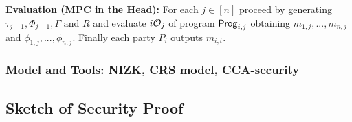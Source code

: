 \noindent
\textbf{Evaluation (MPC in the Head):} For each $j \in [n]$ proceed by generating $\tau_{j-1}, \Phi_{j-1}, \Gamma \mbox{ and } R$ and evaluate $i\mathcal{O}_j$ of program $\mathsf{Prog}_{i,j}$ obtaining $m_{1,j},...,m_{n,j}$
and $\phi_{1,j},...,\phi_{n,j}$. Finally each party $P_i$ outputs $m_{i,t}$.




\subsubsection{Model and Tools: NIZK, CRS model, CCA-security}

\subsection{Sketch of Security Proof}


